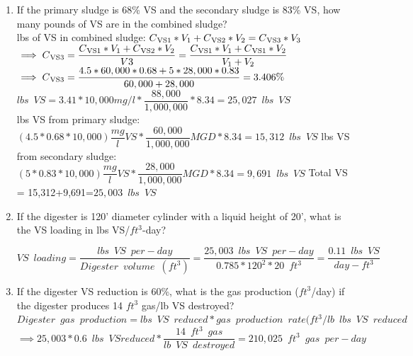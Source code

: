 \documentclass{article}
\begin{document}
\begin{enumerate}
\begin{enumerate}
\item If the primary sludge is 68\% VS and the secondary sludge is 83\% VS, how many pounds of VS are in the combined sludge?\\
lbs of VS in combined sludge:
$
C\textsubscript{VS1}*V_1 + C\textsubscript{VS2}*V_2 = C\textsubscript{VS3}*V_3$\\
$\implies C\textsubscript{VS3} = \dfrac{C\textsubscript{VS1}*V_1 + C\textsubscript{VS2}*V_2}{V3}=\dfrac{C\textsubscript{VS1}*V_1 + C\textsubscript{VS1}*V_2}{V_1 + V_2}$\\
$\implies C\textsubscript{VS3}
=\dfrac{4.5*60,000*0.68 + 5*28,000*0.83}{60,000 + 28,000}=3.406\%$\\
$lbs \enspace VS=3.41*10,000 mg/l * \dfrac{88,000}{1,000,000}*8.34=\boxed{25,027 \enspace lbs \enspace VS}$\\


lbs VS from primary sludge: $(4.5*0.68*10,000)\dfrac{mg}{l}VS*\dfrac{60,000}{1,000,000}MGD*8.34=15,312 \enspace lbs \enspace VS$
lbs VS from secondary sludge: $(5*0.83*10,000)\dfrac{mg}{l}VS*\dfrac{28,000}{1,000,000}MGD*8.34=9,691 \enspace lbs \enspace VS$
Total VS = 15,312+9,691=$\boxed{25,003 \enspace lbs \enspace VS}$

\item If the digester is 120’ diameter cylinder with a liquid height of 20’, what is the VS loading in lbs VS/$ft^3$-day?

$VS \enspace loading=\dfrac{lbs \enspace VS \enspace per-day}{Digester \enspace volume \enspace (ft^3)}=\dfrac{25,003 \enspace lbs \enspace VS \enspace per-day}{0.785*120^2*20 \enspace ft^3}=\boxed{\dfrac{0.11 \enspace lbs \enspace VS}{day-ft^3}}$

\item If the digester VS reduction is 60\%, what is the gas production ($ft^3$/day) if the digester produces 14 $ft^3$ gas/lb VS destroyed?\\
$Digester \enspace gas \enspace production = lbs \enspace VS \enspace reduced * gas \enspace production \enspace rate (ft^3/lb \enspace lbs \enspace VS \enspace reduced$
$\implies 25,003*0.6 \enspace lbs \enspace VS reduced*\dfrac{14 \enspace ft^3 \enspace gas}{lb \enspace VS \enspace destroyed}=\boxed{210,025 \enspace ft^3 \enspace gas \enspace per-day}$


\end{enumerate}
\end{enumerate}
\end{document}
